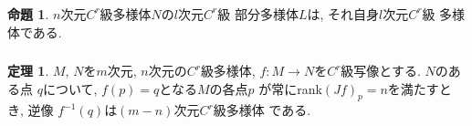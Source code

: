 \documentclass[dvipdfmx,cjk]{beamer}
\theoremstyle{definition}
\newtheorem{thm}[dfn]{\textbf{ 定理 }}
\newtheorem{prop}[dfn]{\textbf{ 命題 }}
\begin{document}
\begin{frame}
  \frametitle{}
  \begin{prop}\label{prop:dim of C^r-submanifold}
    $n$次元$C^r$級多様体$N$の$l$次元$C^r$級
    部分多様体$L$は, それ自身$l$次元$C^r$級
    多様体である. 
\end{prop}
  

\end{frame}
  \begin{frame}
    \frametitle{}
    \begin{thm}\label{theo:f^{-1}(q) C^r manifold}
      $M$, $N$を$m$次元, $n$次元の$C^r$級多様体, 
      $f:M\to N$を$C^r$級写像とする. $N$のある点
      $q$について, $f(p)=q$となる$M$の各点$p$
      が常にrank$(Jf)_p=n$を満たすとき, 逆像
      $f^{-1}(q)$は$(m-n)$次元$C^r$級多様体
      である. 
    \end{thm}
  \end{frame}
\end{document}
